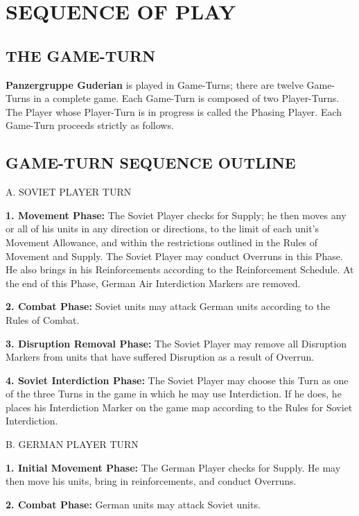 \section{SEQUENCE OF PLAY}

\subsection{THE GAME-TURN}

\textbf{Panzergruppe Guderian} is played in Game-Turns; there are twelve Game-Turns in a complete game. Each Game-Turn is composed of two Player-Turns. The Player whose Player-Turn is in progress is called the Phasing Player. Each Game-Turn proceeds strictly as follows.

\begin{flushleft}
  \subsection{GAME-TURN SEQUENCE OUTLINE}
\end{flushleft}

A. SOVIET PLAYER TURN

\textbf{1. Movement Phase:} The Soviet Player checks for Supply; he then moves any or all of his units in any direction or directions, to the limit of each unit's Movement Allowance, and within the restrictions outlined in the Rules of Movement and Supply. The Soviet Player may conduct Overruns in this Phase. He also brings in his Reinforcements according to the Reinforcement Schedule. At the end of this Phase, German Air Interdiction Markers are removed.

\textbf{2. Combat Phase:} Soviet units may attack German units according to the Rules of Combat.

\textbf{3. Disruption Removal Phase:} The Soviet Player may remove all Disruption Markers from units that have suffered Disruption as a result of Overrun.

\textbf{4. Soviet Interdiction Phase:} The Soviet Player may choose this Turn as one of the three Turns in the game in which he may use Interdiction. If he does, he places his Interdiction Marker on the game map according to the Rules for Soviet Interdiction.

B. GERMAN PLAYER TURN

\textbf{1. Initial Movement Phase:} The German Player checks for Supply. He may then move his units, bring in reinforcements, and conduct Overruns.

\textbf{2. Combat Phase:} German units may attack Soviet units.

